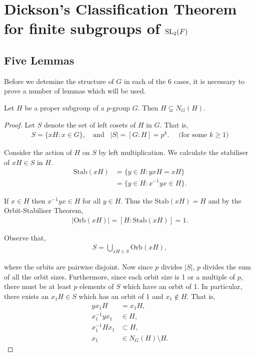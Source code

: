 \chapter{Dickson's Classification Theorem for finite subgroups of $\operatorname{SL}_2(F)$}\label{Ch7_DicksonsClassificationTheorem}

\section{Five Lemmas}

Before we detemine the structure of $G$ in each of the 6 cases, it is necessary to prove a number of lemmas which will be used.

\begin{lemma}
    \label{IsPGroup.not_le_normalizer} 
    \leanok
    Let $H$ be a proper subgroup of a $p$-group $G$. Then $H \subsetneq N_G(H)$.
\end{lemma}
\begin{proof} Let $S$ denote the set of left cosets of $H$ in $G$. That is,
\begin{align*} S = \{ x H : x \in G \}, \quad \text{and} \;\;\; |S| = [G : H] = p^k. \quad \text{ (for some $k \geq 1$)}
\end{align*}

Consider the action of $H$ on $S$ by left multiplication. We calculate the stabiliser of $xH \in S$ in $H$.
\begin{align*} \text{Stab}(xH) &= \{ y \in H : yxH = xH \}
\\ &= \{ y \in H : x^{-1}yx \in H \}.
\end{align*}

If $x \in H$ then $x^{-1}yx \in H$ for all $y \in H$. Thus the Stab$(xH) = H$ and by the Orbit-Stabiliser Theorem,
\begin{align*} |\text{Orb}(xH)| = [H : \text{Stab}(xH)] = 1.
\end{align*}

Observe that,
\begin{align*} S = \bigcup\limits_{xH \in S} \text{Orb}(xH),
\end{align*}

where the orbits are pairwise disjoint. Now since $p$ divides $|S|$, $p$ divides the sum of all the orbit sizes. Furthermore, since each orbit size is 1 or a multiple of $p$, there must be at least $p$ elements of $S$ which have an orbit of 1. In particular, there exists an $x_1 H \in S$ which has an orbit of 1 and $x_1 \not \in H$. That is,
\begin{align*} y x_1 H &= x_ 1 H, \tag{$\forall y \in H$}
\\ x_1^{-1} y x_1 &\in H,
\\ x_1^{-1} H x_1 &\subset H,
\\ x_1 &\in N_G(H) \! \setminus \! H.
\end{align*} 

\end{proof}


